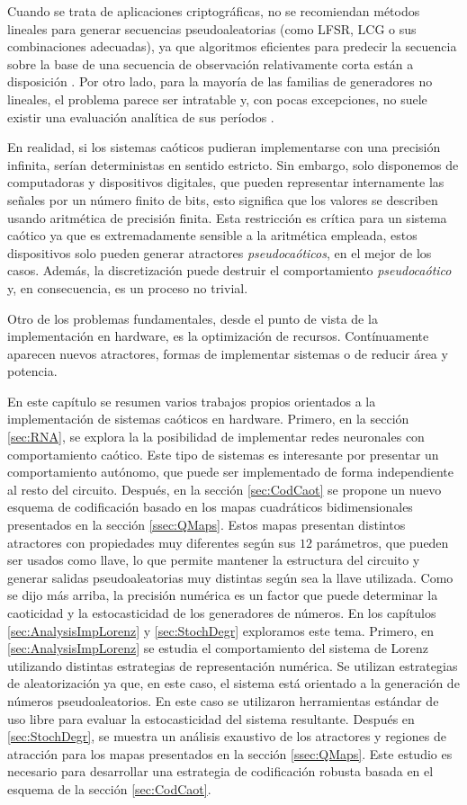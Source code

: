 Cuando se trata de aplicaciones criptográficas, no se recomiendan métodos lineales para generar secuencias pseudoaleatorias (como LFSR, LCG o sus combinaciones adecuadas), ya que algoritmos eficientes para predecir la secuencia sobre la base de una secuencia de observación relativamente corta están a disposición \cite{Boyar1989, Plumstead1982}.
Por otro lado, para la mayoría de las familias de generadores no lineales, el problema parece ser intratable y, con pocas excepciones, no suele existir una evaluación analítica de sus períodos \cite{kocarev2011}.

En realidad, si los sistemas caóticos pudieran implementarse con una precisión infinita, serían deterministas en sentido estricto.
Sin embargo, solo disponemos de computadoras y dispositivos digitales, que pueden representar internamente las señales por un número finito de bits, esto significa que los valores se describen usando aritmética de precisión finita.
Esta restricción es crítica para un sistema caótico ya que es extremadamente sensible a la aritmética empleada, estos dispositivos solo pueden generar atractores \textsl{pseudocaóticos}, en el mejor de los casos.
Además, la discretización puede destruir el comportamiento \textsl{pseudocaótico} y, en consecuencia, es un proceso no trivial.

Otro de los problemas fundamentales, desde el punto de vista de la implementación en hardware, es la optimización de recursos.
Contínuamente aparecen nuevos atractores, formas de implementar sistemas o de reducir área y potencia.

En este capítulo se resumen varios trabajos propios orientados a la implementación de sistemas caóticos en hardware.
Primero, en la sección \ref{sec:RNA}, se explora la la posibilidad de implementar redes neuronales con comportamiento caótico.
Este tipo de sistemas es interesante por presentar un comportamiento autónomo, que puede ser implementado de forma independiente al resto del circuito.
Después, en la sección \ref{sec:CodCaot} se propone un nuevo esquema de codificación basado en los mapas cuadráticos bidimensionales presentados en la sección \ref{ssec:QMaps}.
Estos mapas presentan distintos atractores con propiedades muy diferentes según sus $12$ parámetros, que pueden ser usados como llave, lo que permite mantener la estructura del circuito y generar salidas pseudoaleatorias muy distintas según sea la llave utilizada.
Como se dijo más arriba, la precisión numérica es un factor que puede determinar la caoticidad y la estocasticidad de los generadores de números.
En los capítulos \ref{sec:AnalysisImpLorenz} y \ref{sec:StochDegr} exploramos este tema.
Primero, en \ref{sec:AnalysisImpLorenz} se estudia el comportamiento del sistema de Lorenz utilizando distintas estrategias de representación numérica.
Se utilizan estrategias de aleatorización ya que, en este caso, el sistema está orientado a la generación de números pseudoaleatorios.
En este caso se utilizaron herramientas estándar de uso libre para evaluar la estocasticidad del sistema resultante.
Después en \ref{sec:StochDegr}, se muestra un análisis exaustivo de los atractores y regiones de atracción para los mapas presentados en la sección \ref{ssec:QMaps}.
Este estudio es necesario para desarrollar una estrategia de codificación robusta basada en el esquema de la sección \ref{sec:CodCaot}.
